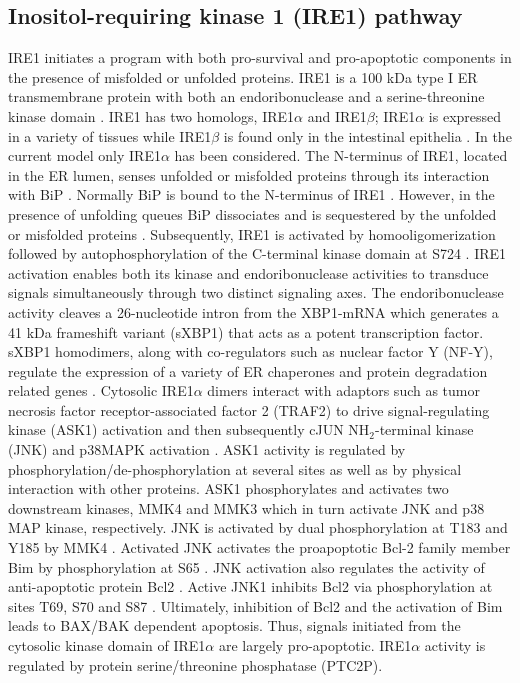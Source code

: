 \documentclass[fleqn,10pt]{wlscirep}
\begin{document}
\subsection*{Inositol-requiring kinase 1 (IRE1) pathway}
IRE1 initiates a program with both pro-survival and pro-apoptotic components in the presence of misfolded or unfolded proteins. IRE1 is a 100 kDa type I ER transmembrane protein with both an endoribonuclease and a serine-threonine kinase domain \cite{kaufman2002unfolded}. IRE1 has two homologs, IRE1$\alpha$ and IRE1$\beta$; IRE1$\alpha$ is expressed in a variety of tissues \cite{tirasophon1998srp} while IRE1$\beta$ is found only in the intestinal epithelia \cite{tirasophon1998srp,wang1998cmi}. In the current model only IRE1$\alpha$ has been considered. The N-terminus of IRE1, located in the ER lumen, senses unfolded or misfolded proteins through its interaction with BiP \cite{cox1993tig,shamu1996oap,sidrauski1997tki}. Normally BiP is bound to the N-terminus of IRE1 \cite{bertolotti2000dib,okamura2000dkb,liu2003sai}. However, in the presence of unfolding queues BiP dissociates and is sequestered by the unfolded or misfolded proteins \cite{kimata2003ger}. Subsequently, IRE1 is activated by homooligomerization followed by autophosphorylation of the C-terminal kinase domain at S724 \cite{shamu1996oap,welihinda1996unfolded,weiss1998sso,papa2003bka}. IRE1 activation enables both its kinase and endoribonuclease activities to transduce signals simultaneously through two distinct signaling axes. The endoribonuclease activity cleaves a 26-nucleotide intron from the XBP1-mRNA \cite{shen2001csp,yoshida2001xmi,lee2002imu} which generates a 41 kDa frameshift variant (sXBP1) that acts as a potent transcription factor. sXBP1 homodimers, along with co-regulators such as nuclear factor Y (NF-Y), regulate the expression of a variety of ER chaperones and protein degradation related genes \cite{malhotra2007era,rao2004mpe}. Cytosolic IRE1$\alpha$ dimers interact with adaptors such as tumor necrosis factor receptor-associated factor 2 (TRAF2) to drive signal-regulating kinase (ASK1) activation and then subsequently cJUN NH$_{2}$-terminal kinase (JNK) and p38MAPK activation \cite{Urano:2000uq}. ASK1 activity is regulated by phosphorylation/de-phosphorylation at several sites as well as by physical interaction with other proteins. ASK1 phosphorylates and activates two downstream kinases, MMK4 and MMK3 which in turn activate JNK and p38 MAP kinase, respectively. JNK is activated by dual phosphorylation at T183 and Y185 by MMK4 \cite{Derijard:1995fk}. Activated JNK activates the proapoptotic Bcl-2 family member Bim by phosphorylation at S65 \cite{lei2003jpb,putcha2003jmb}. JNK activation also regulates the activity of anti-apoptotic protein Bcl2 \cite{yamamoto1999bpa, Wei:2008hc}. Active JNK1 inhibits Bcl2 via phosphorylation at sites T69, S70 and S87 \cite{Wei:2008hc}. Ultimately, inhibition of Bcl2 and the activation of Bim leads to BAX/BAK dependent apoptosis. Thus, signals initiated from the cytosolic kinase domain of IRE1$\alpha$ are largely pro-apoptotic. IRE1$\alpha$ activity is regulated by protein serine/threonine phosphatase (PTC2P).
\end{document}
